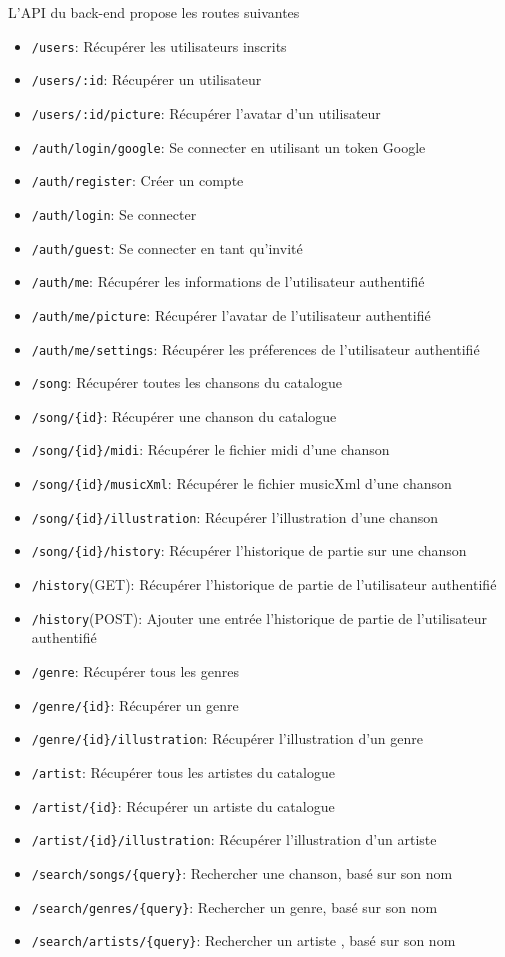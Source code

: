 L'API du back-end propose les routes suivantes

\begin{itemize}
	\item \verb|/users|: Récupérer les utilisateurs inscrits
	\item \verb|/users/:id|: Récupérer un utilisateur
	\item \verb|/users/:id/picture|: Récupérer l'avatar d'un utilisateur
	\item \verb|/auth/login/google|: Se connecter en utilisant un token Google
	\item \verb|/auth/register|: Créer un compte
	\item \verb|/auth/login|: Se connecter
	\item \verb|/auth/guest|: Se connecter en tant qu'invité
	\item \verb|/auth/me|: Récupérer les informations de l'utilisateur authentifié
	\item \verb|/auth/me/picture|: Récupérer l'avatar de l'utilisateur authentifié
	\item \verb|/auth/me/settings|: Récupérer les préferences de l'utilisateur authentifié
	\item \verb|/song|: Récupérer toutes les chansons du catalogue
	\item \verb|/song/{id}|: Récupérer une chanson du catalogue
	\item \verb|/song/{id}/midi|: Récupérer le fichier midi d'une chanson
	\item \verb|/song/{id}/musicXml|: Récupérer le fichier musicXml d'une chanson
	\item \verb|/song/{id}/illustration|: Récupérer l'illustration d'une chanson
	\item \verb|/song/{id}/history|: Récupérer l'historique de partie sur une chanson
	\item \verb|/history|(GET): Récupérer l'historique de partie de l'utilisateur authentifié
	\item \verb|/history|(POST): Ajouter une entrée l'historique de partie de l'utilisateur authentifié
	\item \verb|/genre|: Récupérer tous les genres
	\item \verb|/genre/{id}|: Récupérer un genre
	\item \verb|/genre/{id}/illustration|: Récupérer l'illustration d'un genre
	\item \verb|/artist|: Récupérer tous les artistes du catalogue
	\item \verb|/artist/{id}|: Récupérer un artiste du catalogue
	\item \verb|/artist/{id}/illustration|: Récupérer l'illustration d'un artiste
	\item \verb|/search/songs/{query}|: Rechercher une chanson, basé sur son nom
	\item \verb|/search/genres/{query}|: Rechercher un genre, basé sur son nom
	\item \verb|/search/artists/{query}|: Rechercher un artiste , basé sur son nom
\end{itemize}

